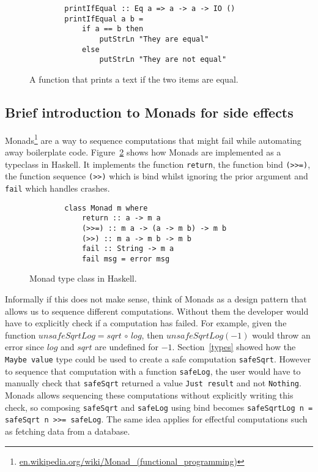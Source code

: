 \begin{figure}[H]
    \begin{lstlisting}
        printIfEqual :: Eq a => a -> a -> IO ()
        printIfEqual a b =
            if a == b then
                putStrLn "They are equal"
            else
                putStrLn "They are not equal"
    \end{lstlisting}
    \caption{A function that prints a text if the two items are equal.}
    \label{printifequal}
\end{figure}


\subsection{Brief introduction to Monads for side effects}\label{monads}

Monads\footnote{\url{en.wikipedia.org/wiki/Monad_(functional_programming)}} are
a way to sequence computations that might fail while automating away boilerplate
code. Figure~\ref{monadclass} shows how Monads are implemented as a typeclass in
Haskell. It implements the function \texttt{return}, the function bind
\texttt{(>>=)}, the function sequence \texttt{(>>)} which is bind whilst
ignoring the prior argument and \texttt{fail} which handles crashes.

\begin{figure}[H]
    \begin{lstlisting}
        class Monad m where  
            return :: a -> m a  
            (>>=) :: m a -> (a -> m b) -> m b  
            (>>) :: m a -> m b -> m b  
            fail :: String -> m a  
            fail msg = error msg 
    \end{lstlisting}
    \caption{Monad type class in Haskell.}
    \label{monadclass}
\end{figure}

Informally if this does not make sense, think of Monads as a design pattern that
allows us to sequence different computations. Without them the developer would
have to explicitly check if a computation has failed. For example, given the
function $unsafeSqrtLog = sqrt\,\circ\,log$, then $unsafeSqrtLog(-1)$ would throw an
error since $log$ and $sqrt$ are undefined for $-1$.  Section~\ref{types} showed
how the \texttt{Maybe value} type could be used to create a safe computation
\texttt{safeSqrt}. However to sequence that computation with a function
\texttt{safeLog}, the user would have to manually check that \texttt{safeSqrt}
returned a value \texttt{Just result} and not \texttt{Nothing}. Monads allows 
sequencing these computations without explicitly writing this check, so
composing \texttt{safeSqrt} and \texttt{safeLog} using bind becomes
\texttt{safeSqrtLog n = safeSqrt n >>= safeLog}. The same idea applies for
effectful computations such as fetching data from a database.


